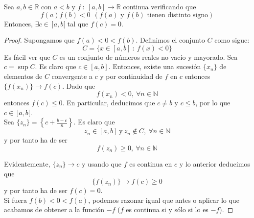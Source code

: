 \begin{teo}
    Sea $a,b \in \mathbb{R}$ con $a < b$ y $f ~:~ [a,b] \longrightarrow \mathbb{R}$ continua verificando que
    \begin{equation*}
        f(a) f(b) < 0 ~~ (\text{$f(a)$ y $f(b)$ tienen distinto signo})
    \end{equation*}
    Entonces, $\exists c \in ~ ]a,b[$ tal que $f(c) = 0$.
\end{teo}
\begin{proof}
    Supongamos que $f(a) < 0 < f(b)$. Definimos el conjunto $C$ como sigue:
    \begin{equation*}
        C= \{x \in [a,b] ~:~ f(x) < 0\}
    \end{equation*}
    Es fácil ver que $C$ es un conjunto de números reales no vacío y mayorado. Sea $c = \sup C$.
    Es claro que $c \in [a,b]$. Entonces, existe una sucesión $\{x_n\}$ de elementos de $C$ convergente
    a $c$ y por continuidad de $f$ en $c$ entonces $\{f(x_n)\} \longrightarrow f(c)$. Dado que
    \begin{equation*}
        f(x_n) < 0, ~ \forall n \in \mathbb{N}
    \end{equation*}
    entonces $f(c) \leq 0$. En particular, deducimos que $c \neq b$ y $c \leq b$, por lo que $c \in ~ ]a,b[$.\\
    
    Sea $\{z_n\} = \left\{c + \frac{b-c}{n}\right\}$. Es claro que
    \begin{equation*}
        z_n \in [a,b] ~ \text{y} ~ z_n \notin C, ~ \forall n \in \mathbb{N}
    \end{equation*}
    y por tanto ha de ser
    \begin{equation*}
        f(z_n) \geq 0, ~ \forall n \in \mathbb{N}
    \end{equation*}
    
    Evidentemente, $\{z_n\} \longrightarrow c$ y usando que $f$ es continua en $c$ y lo anterior deducimos que
    \begin{equation*}
        \{f(z_n)\} \longrightarrow f(c) \geq 0
    \end{equation*}
    y por tanto ha de ser $f(c) = 0$.\\
    
    Si fuera $f(b) < 0 < f(a)$, podemos razonar igual que antes o aplicar lo que acabamos de obtener a la función $-f$
    ($f$ es continua si y sólo si lo es $-f$).
\end{proof}

